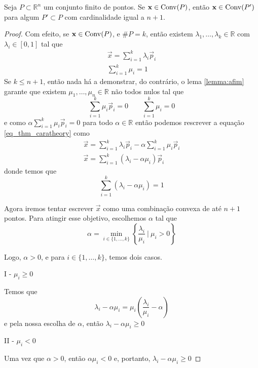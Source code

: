 \begin{thm:caratheodory}[Carathéodory]
	Seja $P \subset \mathbb{R}^n$ um conjunto finito de pontos. Se $\mathbf x \in \mathrm{Conv}(P)$, então
	  $\mathbf x \in \mathrm{Conv}(P')$ para algum $P' \subset P$ com cardinalidade igual a $n + 1$.

	\begin{proof}
		Com efeito, se $\mathbf x \in \mathrm{Conv}(P)$, e $\#P = k$, então existem $\lambda_1, \ldots, \lambda_k
		\in \mathbb{R}$ com $\lambda_i \in [0, 1]$ tal que
		\begin{equation}
		\label{eq_thm_caratheory}
		\begin{gathered}
			\vec x = \displaystyle\sum_{i=1}^k \lambda_i \vec p_i \\
			\displaystyle\sum_{i=1}^k \mu_i = 1
		\end{gathered}
		\end{equation}
		Se $k \leq n + 1$, então nada há a demonstrar, do contrário, o lema \ref{lemma:afim}
		garante que existem $\mu_1, \ldots, \mu_n \in \mathbb{R}$ não todos nulos tal que
		\[
		  \displaystyle\sum_{i=1}^k \mu_i \vec p_i = 0 \quad\quad \sum_{i=1}^{k} \mu_i = 0
		\]
		e como \(\alpha \displaystyle\sum_{i=1}^k \mu_i \vec p_i = 0\) para todo $\alpha \in \mathbb{R}$
		então podemos rescrever a equação \ref{eq_thm_caratheory} como
		\begin{gather*}
			\vec x = \displaystyle\sum_{i=1}^k \lambda_i \vec p_i - \alpha \displaystyle\sum_{i=1}^k \mu_i \vec p_i \\
			\vec x = \displaystyle\sum_{i=1}^k (\lambda_i - \alpha \mu_i) \vec p_i
		\end{gather*}
		donde temos que
		\[\displaystyle\sum_{i=1}^k (\lambda_i - \alpha \mu_i) = 1\]

		Agora iremos tentar escrever $\vec x$ como uma combinação convexa de até $n + 1$ pontos.
		Para atingir esse objetivo, escolhemos $\alpha$ tal que
	    \[
	      \alpha = \min_{i \in \{1, \dots, k\}} \left\{\frac{\lambda_i}{\mu_i}\ |\ \mu_i > 0\right\}
	    \]

		Logo, $\alpha > 0$, e para $i \in \{1, \ldots, k\}$, temos dois casos.

		I - $\mu_i \geq 0$

		Temos que
		\[\lambda_i - \alpha \mu_i = \mu_i \left(\frac{\lambda_i}{\mu_i} - \alpha\right)\]
		e pela nossa escolha de $\alpha$, então \(\lambda_i - \alpha \mu_i \geq 0\)

		II - $\mu_i < 0$

		Uma vez que $\alpha > 0$, então $\alpha \mu_i < 0$ e, portanto,
		\(\lambda_i - \alpha \mu_i \geq 0\)


\end{proof}
\end{thm:caratheodory}
